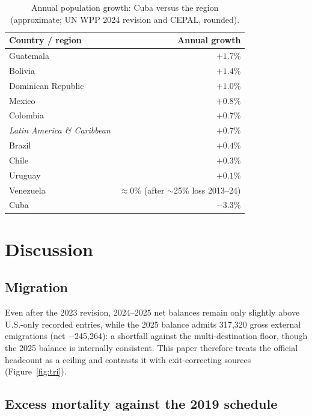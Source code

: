 \documentclass[11pt,a4paper]{article}
\begin{document}
\begin{table}[ht]
\centering
\caption{Annual population growth: Cuba versus the region (approximate; UN WPP 2024 revision and CEPAL, rounded).}
\label{tab:region}
\begin{tabular}{lr}
\toprule
Country / region & Annual growth \\
\midrule
Guatemala & $+1.7\%$ \\
Bolivia & $+1.4\%$ \\
Dominican Republic & $+1.0\%$ \\
Mexico & $+0.8\%$ \\
Colombia & $+0.7\%$ \\
\textit{Latin America \& Caribbean} & $+0.7\%$ \\
Brazil & $+0.4\%$ \\
Chile & $+0.3\%$ \\
Uruguay & $+0.1\%$ \\
Venezuela & $\approx 0\%$ (after $\sim$25\% loss 2013--24) \\
Cuba & $-3.3\%$ \\
\bottomrule
\end{tabular}
\end{table}

\section{Discussion}

\subsection{Migration}

Even after the 2023 revision, 2024--2025 net balances remain only slightly above U.S.-only recorded entries, while the 2025 balance admits 317{,}320 gross external emigrations (net $-$245{,}264): a shortfall against the multi-destination floor, though the 2025 balance is internally consistent.
This paper therefore treats the official headcount as a ceiling and contrasts it with exit-correcting sources (Figure~\ref{fig:tri}).

\subsection{Excess mortality against the 2019 schedule}
\end{document}
